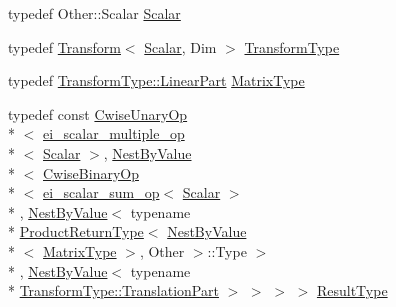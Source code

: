 \begin{DoxyCompactItemize}
\item 
typedef Other\-::\-Scalar \hyperlink{structei__transform__product__impl_3_01_other_00_01_dim_00_01_h_dim_00_01_dim_00_011_01_4_a5c06d7c75fdacd597ae6273085d302a0}{Scalar}
\item 
typedef \hyperlink{class_transform}{Transform}$<$ \hyperlink{structei__transform__product__impl_3_01_other_00_01_dim_00_01_h_dim_00_01_dim_00_011_01_4_a5c06d7c75fdacd597ae6273085d302a0}{Scalar}, Dim $>$ \hyperlink{structei__transform__product__impl_3_01_other_00_01_dim_00_01_h_dim_00_01_dim_00_011_01_4_abf35704bad2bb1335d5421d9008e854e}{Transform\-Type}
\item 
typedef \hyperlink{class_transform_adb8a1fb72e2dcea3ffc41f85e81552b6}{Transform\-Type\-::\-Linear\-Part} \hyperlink{structei__transform__product__impl_3_01_other_00_01_dim_00_01_h_dim_00_01_dim_00_011_01_4_a0e14c2e3d0fb9d91431fbb3c516daaef}{Matrix\-Type}
\item 
typedef const \hyperlink{class_cwise_unary_op}{Cwise\-Unary\-Op}\\*
$<$ \hyperlink{structei__scalar__multiple__op}{ei\-\_\-scalar\-\_\-multiple\-\_\-op}\\*
$<$ \hyperlink{structei__transform__product__impl_3_01_other_00_01_dim_00_01_h_dim_00_01_dim_00_011_01_4_a5c06d7c75fdacd597ae6273085d302a0}{Scalar} $>$, \hyperlink{class_nest_by_value}{Nest\-By\-Value}\\*
$<$ \hyperlink{class_cwise_binary_op}{Cwise\-Binary\-Op}\\*
$<$ \hyperlink{structei__scalar__sum__op}{ei\-\_\-scalar\-\_\-sum\-\_\-op}$<$ \hyperlink{structei__transform__product__impl_3_01_other_00_01_dim_00_01_h_dim_00_01_dim_00_011_01_4_a5c06d7c75fdacd597ae6273085d302a0}{Scalar} $>$\\*
, \hyperlink{class_nest_by_value}{Nest\-By\-Value}$<$ typename \\*
\hyperlink{struct_product_return_type}{Product\-Return\-Type}$<$ \hyperlink{class_nest_by_value}{Nest\-By\-Value}\\*
$<$ \hyperlink{structei__transform__product__impl_3_01_other_00_01_dim_00_01_h_dim_00_01_dim_00_011_01_4_a0e14c2e3d0fb9d91431fbb3c516daaef}{Matrix\-Type} $>$, Other $>$\-::Type $>$\\*
, \hyperlink{class_nest_by_value}{Nest\-By\-Value}$<$ typename \\*
\hyperlink{class_transform_a00ccb56dcd1ca99fb61b87fa229f0440}{Transform\-Type\-::\-Translation\-Part} $>$ $>$ $>$ $>$ \hyperlink{structei__transform__product__impl_3_01_other_00_01_dim_00_01_h_dim_00_01_dim_00_011_01_4_ae26335bd7244467f009fe4529fbea973}{Result\-Type}
\end{DoxyCompactItemize}
